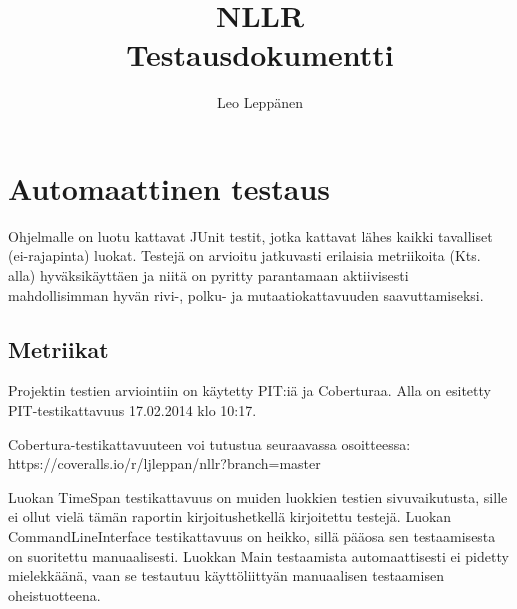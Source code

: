 \documentclass[12pt,a4paper]{article}
\author{Leo Leppänen}
\title{NLLR \\ Testausdokumentti}
\begin{document}
\maketitle

\section{Automaattinen testaus}

Ohjelmalle on luotu kattavat JUnit testit, jotka kattavat lähes kaikki tavalliset (ei-rajapinta) luokat. Testejä on arvioitu jatkuvasti erilaisia metriikoita (Kts. alla) hyväksikäyttäen ja niitä on pyritty parantamaan aktiivisesti mahdollisimman hyvän rivi-, polku- ja mutaatiokattavuuden saavuttamiseksi.

\subsection{Metriikat}
Projektin testien arviointiin on käytetty PIT:iä ja Coberturaa. Alla on esitetty PIT-testikattavuus 17.02.2014 klo 10:17. 

Cobertura-testikattavuuteen voi tutustua seuraavassa osoitteessa: https://coveralls.io/r/ljleppan/nllr?branch=master

Luokan TimeSpan testikattavuus on muiden luokkien testien sivuvaikutusta, sille ei ollut vielä tämän raportin kirjoitushetkellä kirjoitettu testejä. Luokan CommandLineInterface testikattavuus on heikko, sillä pääosa sen testaamisesta on suoritettu manuaalisesti. Luokkan Main testaamista automaattisesti ei pidetty mielekkäänä, vaan se testautuu käyttöliittyän manuaalisen testaamisen oheistuotteena.
\end{document}
